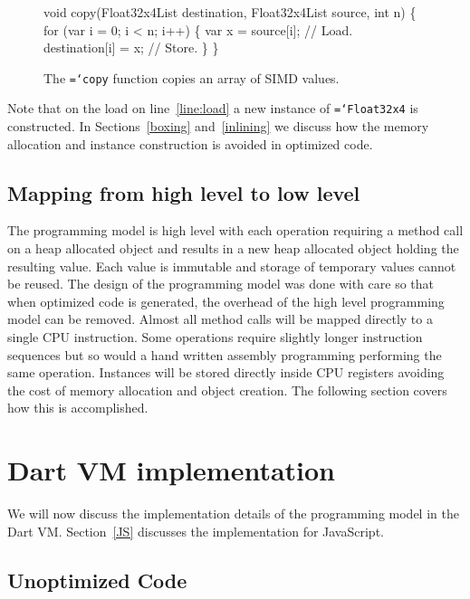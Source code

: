 \documentclass[preprint]{sigplanconf}
\newcommand{\ttt}[1]{{\texttt{\hyphenchar\font=`\-\relax #1}}}%
\begin{document}
\begin{figure}
\begin{small}
\begin{program}[style=tt, number=true]
vo\tab{}id copy(\tab{}Float32x4List destination,
          Float32x4List source,
          int n) \{\untab{}
  fo\tab{}r (var i = 0; i < n; i++) \{
    var x = source[i];   // Load.\label{line:load}
    destination[i] = x;  // Store.\untab{}
  \}\untab{}
\}
\end{program}
\end{small}
\caption{The \ttt{copy} function copies an array of SIMD values.}
\label{fig:load-store}
\end{figure}

Note that on the load on line~\ref{line:load} a new instance of \ttt{Float32x4}
is constructed. In Sections~\ref{boxing} and~\ref{inlining} we discuss how the
memory allocation and instance construction is avoided in optimized code.

\subsection{Mapping from high level to low level}

The programming model is high level with each operation requiring a method call
on a heap allocated object and results in a new heap allocated object holding
the resulting value. Each value is immutable and storage of temporary values
cannot be reused. The design of the programming model was done with care so that
when optimized code is generated, the overhead of the high level programming
model can be removed. Almost all method calls will be mapped directly to a
single CPU instruction. Some operations require slightly longer instruction
sequences but so would a hand written assembly programming performing the same
operation. Instances will be stored directly inside CPU registers avoiding the
cost of memory allocation and object creation. The following section covers how
this is accomplished.

\section{Dart VM implementation}

We will now discuss the implementation details of the programming model in the
Dart VM. Section~\ref{JS} discusses the implementation for JavaScript.

\subsection{Unoptimized Code}
\end{document}
